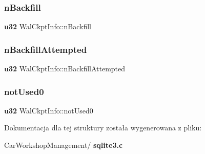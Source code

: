 \subsubsection{nBackfill}
{\footnotesize\ttfamily \textbf{ u32} Wal\+Ckpt\+Info\+::n\+Backfill}

\mbox{\label{struct_wal_ckpt_info_a3598a8ba26b253492f9c1fa0d078b3a5}} 
\subsubsection{nBackfillAttempted}
{\footnotesize\ttfamily \textbf{ u32} Wal\+Ckpt\+Info\+::n\+Backfill\+Attempted}

\mbox{\label{struct_wal_ckpt_info_ac33050a373fd89719253c3cddcc9e5fe}} 
\subsubsection{notUsed0}
{\footnotesize\ttfamily \textbf{ u32} Wal\+Ckpt\+Info\+::not\+Used0}



Dokumentacja dla tej struktury została wygenerowana z pliku\+:\begin{DoxyCompactItemize}
\item 
Car\+Workshop\+Management/\textbf{ sqlite3.\+c}\end{DoxyCompactItemize}
